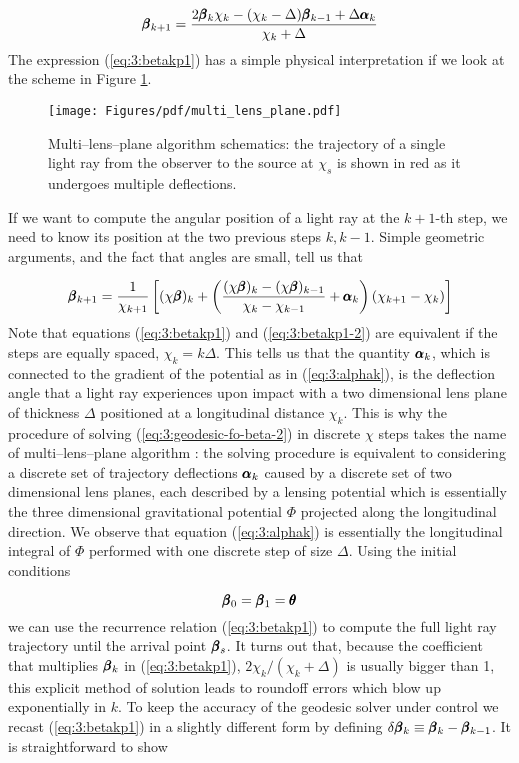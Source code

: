 \begin{equation}
\label{eq:3:betakp1}
\pmb{\beta}_{k+1} = \frac{2\pmb{\beta}_k\chi_k-(\chi_k-\Delta)\pmb{\beta}_{k-1}+\Delta\pmb{\alpha}_k}{\chi_k+\Delta}
\end{equation}  
%
The expression (\ref{eq:3:betakp1}) has a simple physical interpretation if we look at the scheme in Figure \ref{fig:3:multi-lens-plane}.
\begin{figure}
\begin{center}
\texttt{[image: Figures/pdf/multi\_lens\_plane.pdf]}
\end{center}
\caption{Multi--lens--plane algorithm schematics: the trajectory of a single light ray from the observer to the source at $\chi_s$ is shown in red as it undergoes multiple deflections.}
\label{fig:3:multi-lens-plane}
\end{figure}
%
If we want to compute the angular position of a light ray at the $k+1$-th step, we need to know its position at the two previous steps $k,k-1$. Simple geometric arguments, and the fact that angles are small, tell us that 

\begin{equation}
\label{eq:3:betakp1-2}
\pmb{\beta}_{k+1} = \frac{1}{\chi_{k+1}}\left[(\chi\pmb{\beta})_{k} + \left(\frac{(\chi\pmb{\beta})_{k}-(\chi\pmb{\beta})_{k-1}}{\chi_k-\chi_{k-1}}+\pmb{\alpha}_k\right)(\chi_{k+1}-\chi_k) \right]
\end{equation}
%
Note that equations (\ref{eq:3:betakp1}) and (\ref{eq:3:betakp1-2}) are equivalent if the steps are equally spaced, $\chi_k=k\Delta$. This tells us that the quantity $\pmb{\alpha}_k$, which is connected to the gradient of the potential as in (\ref{eq:3:alphak}), is the deflection angle that a light ray experiences upon impact with a two dimensional lens plane of thickness $\Delta$ positioned at a longitudinal distance $\chi_k$. This is why the procedure of solving (\ref{eq:3:geodesic-fo-beta-2}) in discrete $\chi$ steps takes the name of multi--lens--plane algorithm \citep{RayTracingJain,RayTracingHartlap}: the solving procedure is equivalent to considering a discrete set of trajectory deflections $\pmb{\alpha}_k$ caused by a discrete set of two dimensional lens planes, each described by a lensing potential which is essentially the three dimensional gravitational potential $\Phi$ projected along the longitudinal direction. We observe that equation (\ref{eq:3:alphak}) is essentially the longitudinal integral of $\Phi$ performed with one discrete step of size $\Delta$. Using the initial conditions

\begin{equation}
\label{eq:3:initcond}
\pmb{\beta}_0 = \pmb{\beta}_1 = \pmb{\theta} 
\end{equation}    
%
we can use the recurrence relation (\ref{eq:3:betakp1}) to compute the full light ray trajectory until the arrival point $\pmb{\beta}_s$. It turns out that, because the coefficient that multiplies $\pmb{\beta}_k$ in (\ref{eq:3:betakp1}), $2\chi_k/(\chi_k+\Delta)$ is usually bigger than 1, this explicit method of solution leads to roundoff errors which blow up exponentially in $k$. To keep the accuracy of the geodesic solver under control we recast (\ref{eq:3:betakp1}) in a slightly different form by defining $\delta\pmb{\beta}_k \equiv \pmb{\beta}_k-\pmb{\beta}_{k-1}$. It is straightforward to show

